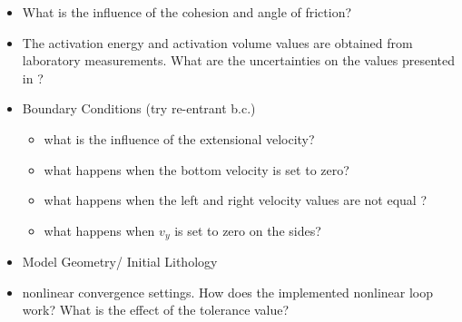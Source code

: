 \documentclass[a4paper]{article}
\begin{document}
\begin{itemize}
\item What is the influence of the cohesion and angle of friction? 
\item The activation energy and activation volume values are obtained from laboratory measurements. What are the uncertainties on the values presented in \cite{nabu15}?
\item Boundary Conditions (try re-entrant b.c.) 
\begin{itemize}
\item what is the influence of the extensional velocity?
\item what happens when the bottom velocity is set to zero?
\item what happens when the left and right velocity values are not equal ?
\item what happens when $v_y$ is set to zero on the sides?
\end{itemize}


\item Model Geometry/ Initial Lithology

\item nonlinear convergence settings. How does the implemented nonlinear loop work? What is the effect of the tolerance value?

\end{itemize}





\end{document}
